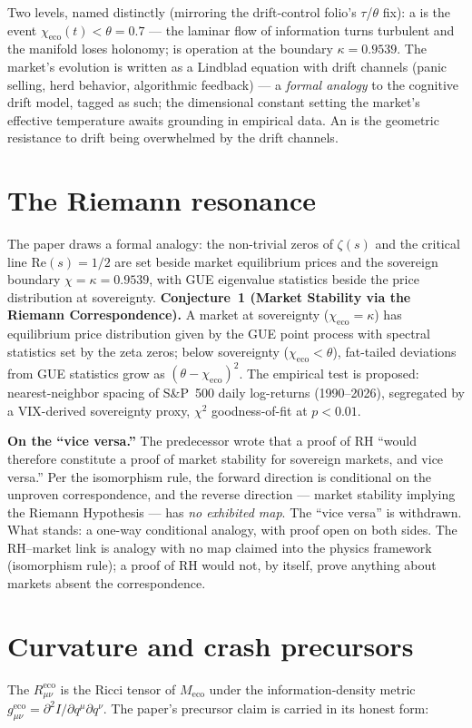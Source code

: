 \documentclass{alienfolio}
\begin{document}
Two levels, named distinctly (mirroring the drift-control folio's
$\tau$/$\theta$ fix): a  is the event
$\chi_{\mathrm{eco}}(t) < \theta = 0.7$ --- the laminar flow of information
turns turbulent and the manifold loses holonomy;  is
operation at the boundary $\kappa = 0.9539$. The market's evolution is
written as a Lindblad equation with drift channels (panic selling, herd
behavior, algorithmic feedback) --- a \emph{formal analogy} to the cognitive
drift model, tagged as such; the dimensional constant setting the market's
effective temperature awaits grounding in empirical data. An
 is the geometric resistance to drift being
overwhelmed by the drift channels.

\section{The Riemann resonance}
The paper draws a formal analogy: the non-trivial zeros of $\zeta(s)$ and
the critical line $\mathrm{Re}(s) = 1/2$ are set beside market equilibrium
prices and the sovereign boundary $\chi = \kappa = 0.9539$, with GUE
eigenvalue statistics beside the price distribution at sovereignty.
 \textbf{Conjecture~1 (Market Stability via the Riemann
Correspondence).} A market at sovereignty ($\chi_{\mathrm{eco}} = \kappa$)
has equilibrium price distribution given by the GUE point process with
spectral statistics set by the zeta zeros; below sovereignty
($\chi_{\mathrm{eco}} < \theta$), fat-tailed deviations from GUE statistics
grow as $(\theta - \chi_{\mathrm{eco}})^2$. The empirical test is proposed:
nearest-neighbor spacing of S\&P~500 daily log-returns (1990--2026),
segregated by a VIX-derived sovereignty proxy, $\chi^2$ goodness-of-fit at
$p < 0.01$.

\textbf{On the ``vice versa.''} The predecessor wrote that a proof of RH
``would therefore constitute a proof of market stability for sovereign
markets, and vice versa.'' Per the isomorphism rule, the forward direction
is conditional on the unproven correspondence, and the reverse direction ---
market stability implying the Riemann Hypothesis --- has \emph{no exhibited
map}. The ``vice versa'' is withdrawn. What stands: a one-way conditional
analogy, with proof open on both sides. The RH--market link is analogy with
no map claimed into the physics framework (isomorphism rule); a proof of RH
would not, by itself, prove anything about markets absent the correspondence.

\section{Curvature and crash precursors}
The  $R^{\mathrm{eco}}_{\mu\nu}$ is the Ricci
tensor of $M_{\mathrm{eco}}$ under the information-density metric
$g^{\mathrm{eco}}_{\mu\nu} = \partial^2 I / \partial q^\mu \partial q^\nu$.
The paper's precursor claim is carried in its honest form:
\end{document}
